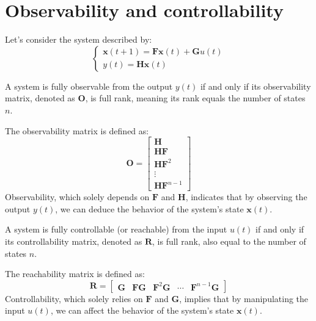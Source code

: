 \section{Observability and controllability}

Let's consider the system described by:
\[\begin{cases} \mathbf{x}(t+1)=\mathbf{Fx}(t)+\mathbf{G}u(t) \\ y(t)=\mathbf{Hx}(t) \end{cases}\]
\begin{definition}
    A system is fully observable from the output $y(t)$ if and only if its observability matrix, denoted as $\mathbf{O}$, is full rank, meaning its rank equals the number of states $n$.
\end{definition}
The observability matrix is defined as: 
\[\mathbf{O}=\begin{bmatrix} \mathbf{H} \\ \mathbf{HF} \\ \mathbf{HF}^2 \\ \vdots \\ \mathbf{HF}^{n-1} \end{bmatrix}\]
Observability, which solely depends on $\mathbf{F}$ and $\mathbf{H}$, indicates that by observing the output $y(t)$, we can deduce the behavior of the system's state $\mathbf{x}(t)$. 

\begin{definition}
    A system is fully controllable (or reachable) from the input $u(t)$ if and only if its controllability matrix, denoted as $\mathbf{R}$, is full rank, also equal to the number of states $n$.
\end{definition}
The reachability matrix is defined as: 
\[\mathbf{R}=\begin{bmatrix} \mathbf{G} & \mathbf{FG} & \mathbf{F}^2\mathbf{G} & \cdots & \mathbf{F}^{n-1}\mathbf{G} \end{bmatrix}\]
Controllability, which solely relies on $\mathbf{F}$ and $\mathbf{G}$, implies that by manipulating the input $u(t)$, we can affect the behavior of the system's state $\mathbf{x}(t)$. 



